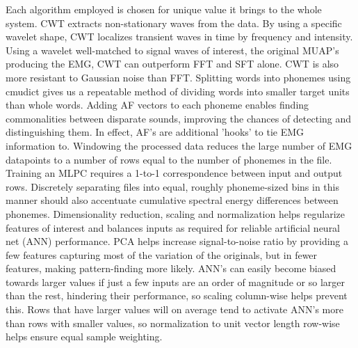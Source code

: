 \documentclass[conference]{IEEEtran}
\begin{document}
Each algorithm employed is chosen for unique value it brings to the whole system. CWT extracts non-stationary waves from the data. By using a specific wavelet shape, CWT localizes transient waves in time by frequency and intensity. Using a wavelet well-matched to signal waves of interest, the original MUAP's producing the EMG, CWT can outperform FFT and SFT alone. CWT is also more resistant to Gaussian noise than FFT. Splitting words into phonemes using cmudict gives us a repeatable method of dividing words into smaller target units than whole words. Adding AF vectors to each phoneme enables finding commonalities between disparate sounds, improving the chances of detecting and distinguishing them. In effect, AF's are additional 'hooks' to tie EMG information to. Windowing the processed data reduces the large number of EMG datapoints to a number of rows equal to the number of phonemes in the file. Training an MLPC requires a 1-to-1 correspondence between input and output rows. Discretely separating files into equal, roughly phoneme-sized bins in this manner should also accentuate cumulative spectral energy differences between phonemes. Dimensionality reduction, scaling and normalization helps regularize features of interest and balances inputs as required for reliable artificial neural net (ANN) performance.  PCA helps increase signal-to-noise ratio by providing a few features capturing most of the variation of the originals, but in fewer features, making pattern-finding more likely. ANN's can easily become biased towards larger values if just a few inputs are an order of magnitude or so larger than the rest, hindering their performance, so scaling column-wise helps prevent this. Rows that have larger values will on average tend to activate ANN's more than rows with smaller values, so normalization to unit vector length row-wise helps ensure equal sample weighting.

\end{document}
